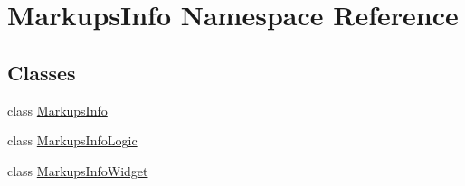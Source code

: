 \hypertarget{namespace_markups_info}{}\section{Markups\+Info Namespace Reference}
\label{namespace_markups_info}
\subsection*{Classes}
\begin{DoxyCompactItemize}
\item 
class \hyperlink{class_markups_info_1_1_markups_info}{Markups\+Info}
\item 
class \hyperlink{class_markups_info_1_1_markups_info_logic}{Markups\+Info\+Logic}
\item 
class \hyperlink{class_markups_info_1_1_markups_info_widget}{Markups\+Info\+Widget}
\end{DoxyCompactItemize}
